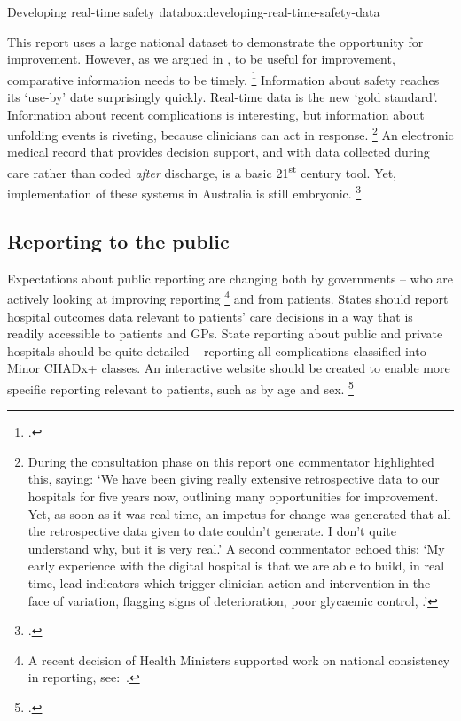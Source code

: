 \documentclass[FrontPage]{grattan}
\begin{document}
\begin{smallbox}{Developing real-time safety data}{box:developing-real-time-safety-data}

This report uses a large national dataset to demonstrate the opportunity for improvement.
However, as we argued in , to be useful for improvement, comparative information needs to be timely.%
	\footcite{DuckettEtAl-2017-Strengthening-safety-statistics}
Information about safety reaches its `use-by' date surprisingly quickly.
Real-time data is the new `gold standard'.
Information about recent complications is interesting, but information about unfolding events is riveting, because clinicians can act in response.%
	\footnote{During the consultation phase on this report one commentator highlighted this, saying: `We have been giving really extensive retrospective data to our hospitals for five years now, outlining many opportunities for improvement.
	Yet, as soon as it was real time, an impetus for change was generated that all the retrospective data given to date couldn't generate.
	I don't quite understand why, but it is very real.' A second commentator echoed this: `My early experience with the digital hospital is that we are able to build, in real time, lead indicators which trigger clinician action and intervention in the face of variation, flagging signs of deterioration, poor glycaemic control, \etc.'}
An electronic medical record that provides decision support, and with data collected during care rather than coded \emph{after} discharge, is a basic 21\textsuperscript{st} century tool.
Yet, implementation of these systems in Australia is still embryonic.%
	\footcite{Sullivan_2016}
\end{smallbox}

\CenturyFootnote
\subsection{Reporting to the public}\label{subsec:reporting-to-the-public}

Expectations about public reporting are changing both by governments -- who are actively looking at improving reporting%
	\footnote{A recent decision of Health Ministers supported work on national consistency in reporting, see: \textcolor{blue}{\coagURL}\,.} %
\space\textendash{} and from patients.
States should report hospital outcomes data relevant to patients' care decisions in a way that is readily accessible to patients and GPs.
State reporting about public and private hospitals should be quite detailed -- reporting all complications classified into Minor CHADx+ classes.
An interactive website should be created to enable more specific reporting relevant to patients, such as by age and sex.%
	\footcite{Greenhalgh_2017}
\end{document}
